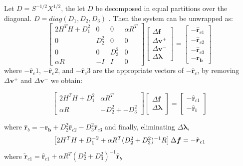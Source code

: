 \documentclass[12pt,a4paper,twoside]{report}
\begin{document}
{Let $D = S^{-1/2}X^{1/2}$, the let $D$ be decomposed in equal partitions over the diagonal. $D = diag(D_1, D_2, D_3)$ .
Then the system can be unwrapped as:
\begin{equation}
\begin{bmatrix}
2H^TH+D_1^{2} & 0 & 0 &\alpha R ^T\\
0 & D_2^{2} & 0 & 0 \\
 0 & 0 &  D_3^{2} & 0\\
\alpha R &-I & I & 0  
\end{bmatrix} 
\begin{bmatrix}
\Delta\boldsymbol{f} \\ 
\Delta\boldsymbol{v}^+ \\ 
\Delta\boldsymbol{v}^- \\ 
\Delta\boldsymbol{\lambda} 
\end{bmatrix} =
\begin{bmatrix}
-\hat{\boldsymbol{r}}_{c1} \\
-\hat{\boldsymbol{r}}_{c2} \\
-\hat{\boldsymbol{r}}_{c3} \\
 \boldsymbol{-r_b} 
\end{bmatrix}
\end{equation}
where $-\hat{\boldsymbol{r}}_c1$, $-\hat{\boldsymbol{r}}_c2$,  and $-\hat{\boldsymbol{r}}_c3$ are the appropriate vectors of $-\hat{\boldsymbol{r}}_c$, 
by removing $\Delta \boldsymbol{v}^+$ and $\Delta \boldsymbol{v}^-$ we obtain:

\begin{equation}
\begin{bmatrix}
2H^TH+D_1^{2} &\alpha R ^T\\
 \alpha R & -D_2^{2} + -D_3^{2} 
\end{bmatrix} 
\begin{bmatrix}
\Delta\boldsymbol{f} \\ 
\Delta\boldsymbol{\lambda} 
\end{bmatrix} =
\begin{bmatrix}
-\hat{\boldsymbol{r}}_{c1} \\
-\hat{\boldsymbol{r}}_b  
\end{bmatrix}
\end{equation}

 where 
 $\hat{\boldsymbol{r}}_b =  \boldsymbol{-r_b} + D^2_2\hat{\boldsymbol{r}}_{c2} - D^2_3\hat{\boldsymbol{r}}_{c3}$
 and finally, eliminating $\Delta\boldsymbol{\lambda}$,
 \begin{equation} \label{lmnXeq}
 \begin{bmatrix}
 2H^TH+D_1^{-2} + \alpha R ^T( D_2^{2} +  D_3^{2} )^{-1}R
 \end{bmatrix} 
 \Delta\boldsymbol{f}  =
 -\tilde{\boldsymbol{r}}_{c1} \\
 \end{equation}
 where $\tilde{\boldsymbol{r}}_{c1} = \hat{\boldsymbol{r}}_{c1} + \alpha R ^T( D_2^{2} +  D_3^{2} )^{-1} \hat{\boldsymbol{r}}_{b}$
 
}
\end{document}
